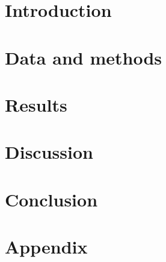 \documentclass[final,3p,times]{elsarticle}
\begin{document}



\section{Introduction}




\section{Data and methods}



\section{Results}



\section{Discussion}


\section{Conclusion}


 \cleardoublepage
\onecolumn
\appendix
\section{Appendix}


\clearpage




\twocolumn









\end{document}
